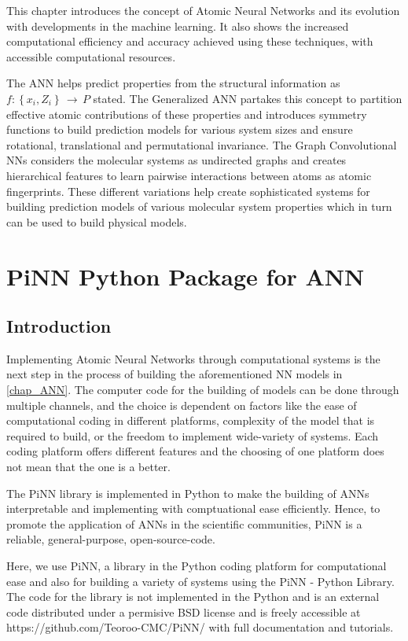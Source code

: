 \documentclass[11pt,a4paper]{report}
\begin{document}
{This chapter introduces the concept of Atomic Neural Networks and its evolution with developments in the machine learning. It also shows the increased computational efficiency and accuracy achieved using these techniques, with accessible computational resources. 

The ANN helps predict properties from the structural information as $f:\left\{x_i, Z_i\right\}\,\to\,P$ stated. The Generalized ANN partakes this concept to partition effective atomic contributions of these properties and introduces symmetry functions to build prediction models for various system sizes and ensure rotational, translational and permutational invariance. The Graph Convolutional NNs considers the molecular systems as undirected graphs and creates hierarchical features to learn pairwise interactions between atoms as atomic fingerprints\cite{atmfing}. These different variations help create sophisticated systems for building prediction models of various molecular system properties which in turn can be used to build physical models.


\chapter{PiNN Python Package for ANN}

\section{Introduction}
Implementing Atomic Neural Networks through computational systems is the next step in the process of building the aforementioned NN models in \ref{chap_ANN}. The computer code for the building of models can be done through multiple channels, and the choice is dependent on factors like the ease of computational coding in different platforms, complexity of the model that is required to build, or the freedom to implement wide-variety of systems. 
Each coding platform offers different features and the choosing of one platform does not mean that the one is a better. 

The PiNN library\cite{PiNN} is implemented in Python to make the building of ANNs interpretable and implementing with comptuational ease efficiently. Hence, to promote the application of ANNs in the scientific communities, PiNN is a reliable, general-purpose, open-source-code.

Here, we use PiNN, a library in the Python coding platform for computational ease and also for building a variety of systems using the PiNN - Python Library. The code for the library is not implemented in the Python  and is an external code distributed under a permisive BSD license and is freely accessible at https://github.com/Teoroo-CMC/PiNN/ with full documentation and tutorials.


}
\end{document}
